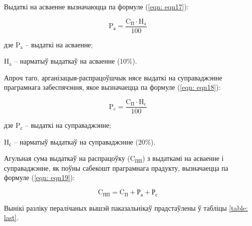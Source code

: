 Выдаткі на асваенне вызначаюцца па формуле (\ref{eqn: eqn17}):

\begin{equation}
    \label{eqn: eqn17}
    \text{P}_\text{а} = \frac{\text{C}_\text{П} \cdot \text{H}_\text{a}}{100}
\end{equation}
\begin{Explanation}
    \item[дзе] $\text{P}_\text{a}$ -- выдаткі на асваенне;
    \item $\text{H}_\text{a}$ -- нарматыў выдаткаў на асваенне (10\%).
\end{Explanation}

Апроч таго, арганізацыя-распрацоўшчык нясе выдаткі на суправаджэнне праграмнага забеспячэння, якое вызначаецца па формуле (\ref{eqn: eqn18}):

\begin{equation}
    \label{eqn: eqn18}
    \text{P}_\text{c} = \frac{\text{C}_\text{П} \cdot \text{H}_\text{c}}{100}
\end{equation}
\begin{Explanation}
    \item[дзе] $\text{P}_\text{с}$ -- выдаткі на суправаджэнне;
    \item $\text{H}_\text{с}$ -- нарматыў выдаткаў на суправаджэнне (20\%).
\end{Explanation}

Агульная сума выдаткаў на распрацоўку ($\text{C}_\text{ПП}$) з выдаткамі на асваенне і суправаджэнне, як поўны сабекошт праграмнага прадукту, вызначаецца па формуле (\ref{eqn: eqn19}):

\begin{equation}
    \label{eqn: eqn19}
    \text{C}_\text{ПП} = \text{C}_\text{П} + \text{Р}_\text{а} + \text{Р}_\text{с}
\end{equation}

Вынікі разліку пералічаных вышэй паказальнікаў прадстаўлены ў табліцы \ref{table: last}.

\clearpage

